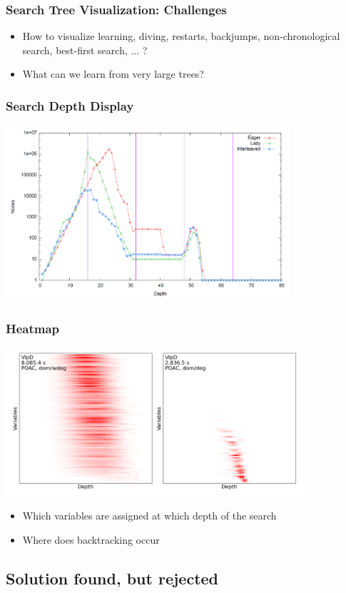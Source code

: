 \documentclass[dvipsnames,aspectratio=169]{beamer}
\begin{document}
\begin{frame}
  \frametitle{Search Tree Visualization: Challenges}
    \begin{itemize}
    \item How to visualize learning, diving, restarts, backjumps, non-chronological search, best-first search, ... ?
    \item What can we learn from very large trees?
    \end{itemize}
\end{frame}

\begin{frame}
  \frametitle{Search Depth Display \cite{DBLP:conf/cpaior/SimonisO11}}
  \includegraphics[width=10.5cm]{images/searchdepth}
\end{frame}

\begin{frame}
  \frametitle{Heatmap \cite{DBLP:conf/cp/HowellCY20}}
  \includegraphics[width=11cm]{images/heatmaphowell}
  \begin{itemize}
      \item Which variables are assigned at which depth of the search
      \item Where does backtracking occur
  \end{itemize}
\end{frame}

\subsection*{Solution found, but rejected}
\end{document}
